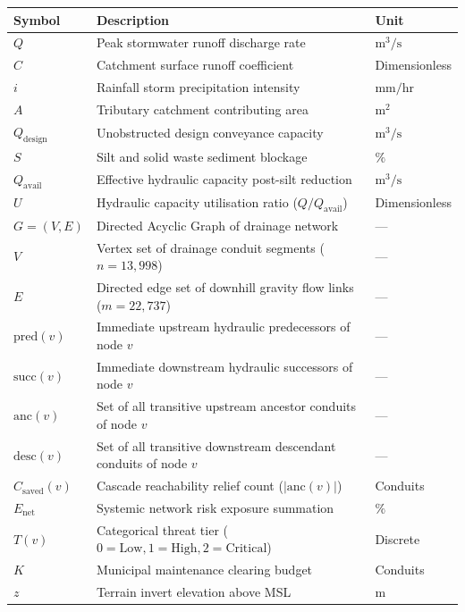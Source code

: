 \documentclass[12pt,a4paper]{report}
\begin{document}
\begin{table}[h!]
\centering
\begin{tabular}{lll}
\textbf{Symbol} & \textbf{Description} & \textbf{Unit} \\
\hline
$Q$ & Peak stormwater runoff discharge rate & $\text{m}^3/\text{s}$ \\
$C$ & Catchment surface runoff coefficient & Dimensionless \\
$i$ & Rainfall storm precipitation intensity & $\text{mm}/\text{hr}$ \\
$A$ & Tributary catchment contributing area & $\text{m}^2$ \\
$Q_{\text{design}}$ & Unobstructed design conveyance capacity & $\text{m}^3/\text{s}$ \\
$S$ & Silt and solid waste sediment blockage & $\%$ \\
$Q_{\text{avail}}$ & Effective hydraulic capacity post-silt reduction & $\text{m}^3/\text{s}$ \\
$U$ & Hydraulic capacity utilisation ratio ($Q / Q_{\text{avail}}$) & Dimensionless \\
$G = (V, E)$ & Directed Acyclic Graph of drainage network & --- \\
$V$ & Vertex set of drainage conduit segments ($n = 13,998$) & --- \\
$E$ & Directed edge set of downhill gravity flow links ($m = 22,737$) & --- \\
$\text{pred}(v)$ & Immediate upstream hydraulic predecessors of node $v$ & --- \\
$\text{succ}(v)$ & Immediate downstream hydraulic successors of node $v$ & --- \\
$\text{anc}(v)$ & Set of all transitive upstream ancestor conduits of node $v$ & --- \\
$\text{desc}(v)$ & Set of all transitive downstream descendant conduits of node $v$ & --- \\
$C_{\text{saved}}(v)$ & Cascade reachability relief count ($|\text{anc}(v)|$) & Conduits \\
$E_{\text{net}}$ & Systemic network risk exposure summation & $\%$ \\
$T(v)$ & Categorical threat tier ($0 = \text{Low}, 1 = \text{High}, 2 = \text{Critical}$) & Discrete \\
$K$ & Municipal maintenance clearing budget & Conduits \\
$z$ & Terrain invert elevation above MSL & $\text{m}$ \\
\hline
\end{tabular}
\end{table}
\end{document}
